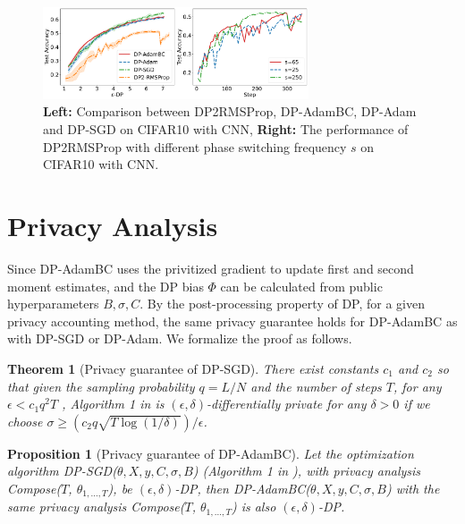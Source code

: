 \documentclass[letterpaper]{article} %
\newtheorem{proposition}{Proposition}
\newtheorem{theorem}{Theorem}
\begin{document}
\begin{figure}[htb]
    \centering
    \includegraphics[width=0.7\textwidth]{figs/dp2_cifar_only.pdf}
    \caption{\textbf{Left:} Comparison between DP2RMSProp, DP-AdamBC, DP-Adam and DP-SGD on CIFAR10 with CNN, \textbf{Right:} The performance of DP2RMSProp with different phase switching frequency $s$ on CIFAR10 with CNN.}
    \label{fig:compare_dp2_cifar_only}
\end{figure}


\section{Privacy Analysis}
\label{apdix:privacy_proof}
Since DP-AdamBC uses the privitized gradient to update first and second moment estimates, and the DP bias $\Phi$ can be calculated from public hyperparameters $B, \sigma, C$. By the post-processing property of DP, for a given privacy accounting method, the same privacy guarantee holds for DP-AdamBC as with DP-SGD or DP-Adam. We formalize the proof as follows.

\begin{theorem}[Privacy guarantee of DP-SGD]
There exist constants $c_1$ and $c_2$ so that given the sampling probability $q=L/N$ and the number of steps $T$, for any $\epsilon < c_1 q^2 T$ , Algorithm 1 in \citet{abadi2016deep} is $(\epsilon, \delta)$-differentially private for any $\delta>0$ if we choose $\sigma \geq (c_2 q \sqrt{T \log{(1/\delta)}}) / \epsilon$.
\end{theorem}

\begin{proposition}[Privacy guarantee of DP-AdamBC]
    Let the optimization algorithm DP-SGD($\theta, X, y, C, \sigma, B$) (Algorithm 1 in \citet{abadi2016deep}),
    with privacy analysis \textit{Compose}($T$, $\theta_{1,\ldots,T}$), be $(\epsilon, \delta)$-DP, then DP-AdamBC($\theta, X, y, C, \sigma, B$) with the same privacy analysis \textit{Compose}($T$, $\theta_{1,\ldots,T}$) is also $(\epsilon, \delta)$-DP.
\end{proposition}
\end{document}
